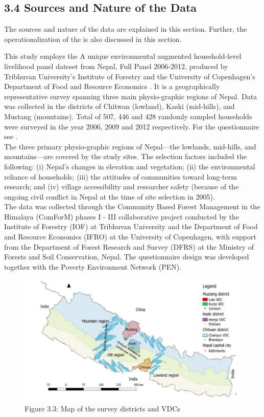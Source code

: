 \documentclass[12pt, a4paper]{article}
\begin{document}
\subsection*{3.4 Sources and Nature of the Data}
\renewcommand{\thepage}{\arabic{page}}
The sources and nature of the data are explained in this section. Further, the operationalization of the is also discussed in this section.

This study employs the A unique environmental augmented household-level livelihood panel dateset \citep{walelign2022unique} from
Nepal, Full Panel 2006-2012, produced by Tribhuvan University’s Institute of Forestry and the University of Copenhagen’s Department of Food and Resource Economics . It is a geographically representative survey spanning three main physio-graphic regions of Nepal. Data was collected in the districts of Chitwan (lowland), Kaski (mid-hills), and Mustang (mountains). Total of 507, 446 and 428 randomly sampled households were surveyed in the year 2006, 2009 and 2012 respectively. For the questionnaire see \cite{larsen2014role}. \\
The three primary physio-graphic regions of Nepal—the lowlands, mid-hills, and mountains—are covered by the study sites. The selection factors included the following: (i) Nepal's changes in elevation and vegetation; (ii) the environmental reliance of households; (iii) the attitudes of communities toward long-term research; and (iv) village accessibility and researcher safety (because of the ongoing civil conflict in Nepal at the time of site selection in 2005).\\
The data was collected through the Community Based Forest Management in the Himalaya
(ComForM) phases I - III collaborative project conducted by the Institute of Forestry (IOF) at Tribhuvan University and the Department of Food and Resource Economics (IFRO) at the University
of Copenhagen, with support from the Department of Forest Research and Survey (DFRS) at the
Ministry of Forests and Soil Conservation, Nepal. The questionnaire design was developed together with the Poverty Environment Network (PEN).\\
\begin{figure}[H]
	\centering
	\includegraphics[scale=0.31]{Study site.png}
	\caption*{Figure 3.3: Map of the survey districts and VDCs}
	\label{fig:Surveymap}
\end{figure}
\end{document}
